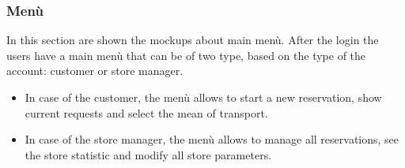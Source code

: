 \documentclass{article}
\begin{document}
		\newpage
		
		\subsubsection{Menù}
		In this section are shown the mockups about main menù. After the login the users have a main menù that can be of two type, based on the type of the account: customer or store manager.
		\begin{itemize}
			\item In case of the customer, the menù allows to start a new reservation, show current requests and select the mean of transport.
			\item In case of the store manager, the menù allows to manage all reservations, see the store statistic and modify all store parameters.
		\end{itemize}
		\bigskip
		\bigskip
\end{document}
